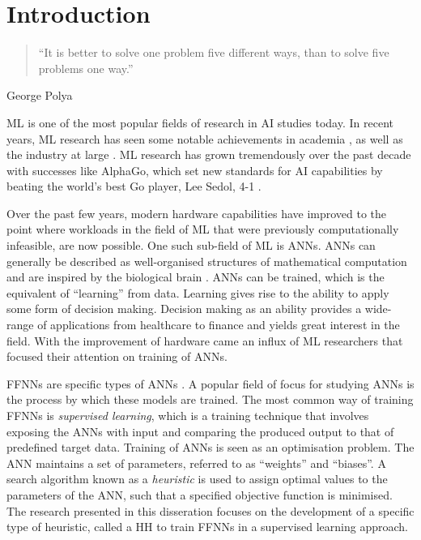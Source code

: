 \chapter{Introduction}\label{chap:introduction}

\begin{quotation}
      \noindent ``It is better to solve one problem five different ways, than to solve five problems one way.''
\end{quotation}
\begin{flushright}
      George Polya
\end{flushright}

\noindent
\Ac{ML} is one of the most popular fields of research in \ac{AI} studies today. In recent years, \ac{ML} research has seen some notable achievements in academia \cite{ref:lecun:2015, ref:glorot:2010, ref:goodfellow:2014, ref:quoc:2017}, as well as the industry at large \cite{ref:silver:2016, ref:silver:2017, ref:zoph:2017, ref:lewis:2017}.  \ac{ML} research has grown tremendously over the past decade with successes like AlphaGo, which set new standards for \ac{AI} capabilities by beating the world's best Go player, Lee Sedol, 4-1 \cite{ref:san-hun:2016}.

Over the past few years, modern hardware capabilities have improved to the point where workloads in the field of \ac{ML} that were previously computationally infeasible, are now possible. One such sub-field of \ac{ML} is \acp{ANN}. \acp{ANN} can generally be described as well-organised structures of mathematical computation and are inspired by the biological brain \cite{ref:engelbrecht:2007}. \acp{ANN} can be trained, which is the equivalent of ``learning'' from data. Learning gives rise to the ability to apply some form of decision making. Decision making as an ability provides a wide-range of applications from healthcare to finance and yields great interest in the field. With the improvement of hardware came an influx of \ac{ML} researchers that focused their attention on training of \acp{ANN}.

\Acfp{FFNN} are specific types of \acp{ANN} \cite{ref:reed:1999}. A popular field of focus for studying \acp{ANN} is the process by which these models are trained.  The most common way of training \acp{FFNN} is \textit{supervised learning}, which is a training technique that involves exposing the \acp{ANN} with input and comparing the produced output to that of predefined target data. Training of \acp{ANN} is seen as an optimisation problem. The \ac{ANN} maintains a set of parameters, referred to as ``weights'' and ``biases''. A search algorithm known as a \textit{heuristic} \cite{ref:pearl:1984} is used to assign optimal values to the parameters of the \ac{ANN}, such that a specified objective function is minimised. The research presented in this disseration focuses on the development of a specific type of heuristic, called a \acl{HH} to train \acp{FFNN} in a supervised learning approach.

